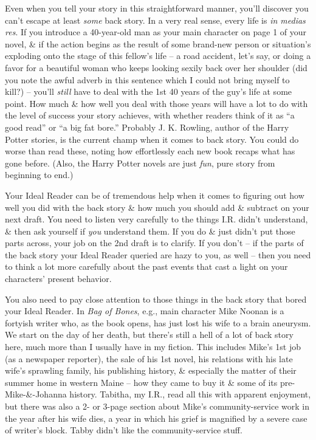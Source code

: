 \documentclass{article}
\numberwithin{equation}{section}
\begin{document}
Even when you tell your story in this straightforward manner, you'll discover you can't escape at least \textit{some} back story. In a very real sense, every life is \textit{in medias res}. If you introduce a 40-year-old man as your main character on page 1 of your novel, \& if the action begins as the result of some brand-new person or situation's exploding onto the stage of this fellow's life -- a road accident, let's say, or doing a favor for a beautiful woman who keeps looking sexily back over her shoulder (did you note the awful adverb in this sentence which I could not bring myself to kill?) -- you'll \textit{still} have to deal with the 1st 40 years of the guy's life at some point. How much \& how well you deal with those years will have a lot to do with the level of success your story achieves, with whether readers think of it as ``a good read'' or ``a big fat bore.'' Probably J. K. Rowling, author of the Harry Potter stories, is the current champ when it comes to back story. You could do worse than read these, noting how effortlessly each new book recaps what has gone before. (Also, the Harry Potter novels are just \textit{fun}, pure story from beginning to end.)

Your Ideal Reader can be of tremendous help when it comes to figuring out how well you did with the back story \& how much you should add \& subtract on your next draft. You need to listen very carefully to the things I.R. didn't understand, \& then ask yourself if \textit{you} understand them. If you do \& just didn't put those parts across, your job on the 2nd draft is to clarify. If you don't -- if the parts of the back story your Ideal Reader queried are hazy to you, as well -- then you need to think a lot more carefully about the past events that cast a light on your characters' present behavior.

You also need to pay close attention to those things in the back story that bored your Ideal Reader. In \textit{Bag of Bones}, e.g., main character Mike Noonan is a fortyish writer who, as the book opens, has just lost his wife to a brain aneurysm. We start on the day of her death, but there's still a hell of a lot of back story here, much more than I usually have in my fiction. This includes Mike's 1st job (as a newspaper reporter), the sale of his 1st novel, his relations with his late wife's sprawling family, his publishing history, \& especially the matter of their summer home in western Maine -- how they came to buy it \& some of its pre-Mike-\&-Johanna history. Tabitha, my I.R., read all this with apparent enjoyment, but there was also a 2- or 3-page section about Mike's community-service work in the year after his wife dies, a year in which his grief is magnified by a severe case of writer's block. Tabby didn't like the community-service stuff.
\end{document}

